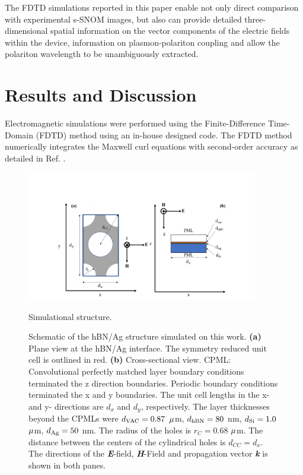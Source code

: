 \documentclass[12pt]{report}
\begin{document}
    The FDTD simulations reported in this paper enable not only direct comparison with experimental s-SNOM images, but also can provide detailed three-dimensional spatial information on the vector components of the electric fields within the device, information on plasmon-polariton coupling and allow the polariton wavelength to be unambiguously extracted.

  \section{Results and Discussion}
  \label{sec:RnD}
    Electromagnetic simulations were performed using the Finite-Difference Time-Domain (FDTD) method    \cite{Kane:66} using an in-house designed code. The FDTD method numerically integrates the Maxwell curl equations with second-order accuracy as detailed in Ref. \cite{Taflove:05}.

      \begin{figure}[h]
        \centering\includegraphics[width=0.9\textwidth]{FiguresCh4/StructurehBNAgHex.png}
        \caption{Simulational structure.}
        \caption*{Schematic of the hBN/Ag structure simulated on this work. \textbf{(a)} Plane view at the hBN/Ag interface. The symmetry reduced unit cell is outlined in red. \textbf{(b)} Cross-sectional view. CPML: Convolutional perfectly matched layer boundary conditions terminated the z direction boundaries. Periodic boundary conditions terminated the x and y boundaries. The unit cell lengths in the x- and y- directions are $d_{x} $ and $d_{y}$, respectively. The layer thicknesses beyond the CPMLs were $d_{\rm{VAC}} = 0.87$ $\rm \mu$m, $d_{\rm{hBN}} = 80$ nm, $d_{\rm{Si}} = 1.0$ $\rm \mu$m, $d_{\rm{Ag}} = 50$ nm. The radius of the holes is $r_{C} = 0.68$ $\rm \mu$m. The distance between the centers of the cylindrical holes is $d_{CC} = d_{x} $. The directions of the \textbf{\textit{E}}-field, \textbf{\textit{H}}-Field and propagation vector \textbf{\textit{k}} is shown in both panes.}
        \label{fig:1}
      \end{figure}
\end{document}
